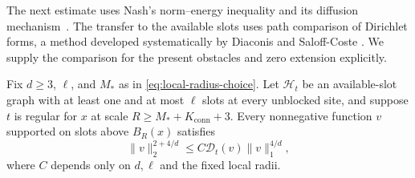 The next estimate uses Nash's norm--energy inequality and its diffusion
mechanism~\cite[Part~I]{Nash1958}.  The transfer to the available slots
uses path comparison of Dirichlet forms, a method developed
systematically by Diaconis and Saloff-Coste
\cite[Theorem~2.1]{DiaconisSaloffCoste1993}.  We supply the comparison
for the present obstacles and zero extension explicitly.

\begin{proposition}\label{prop:local-nash}
Fix \(d\ge3\), \(\ell\), and \(M_*\) as in
\eqref{eq:local-radius-choice}.  Let \(\mathcal H_t\) be an available-slot
graph with at least one and at most \(\ell\) slots at every unblocked
site, and suppose \(t\) is regular for \(x\) at scale
\(R\ge M_*+K_{\mathrm{conn}}+3\).
Every nonnegative function \(v\) supported on slots above \(B_R(x)\)
satisfies
\begin{equation}\label{eq:local-nash}
 \|v\|_2^{2+4/d}\le C\mathcal D_t(v)\|v\|_1^{4/d},
\end{equation}
where \(C\) depends only on \(d,\ell\) and the fixed local radii.
\end{proposition}

